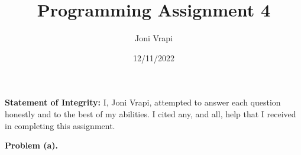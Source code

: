 \documentclass{article}
\title{Programming Assignment 4}
\author{Joni Vrapi}
\date{12/11/2022}
\begin{document}
\maketitle

\textbf{Statement of Integrity:} I, Joni Vrapi, attempted to answer each question honestly and to the best of my abilities. I cited any, and all, help that I received in completing this assignment.

\hfill

\textbf{Problem (a).} 

\newpage
 

\end{document}
